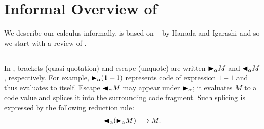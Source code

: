 
\section{Informal Overview of \LMD \label{sec:informal-overview}}

We describe our calculus \LMD informally.  \LMD is based on
\LTP~\cite{Hanada2014} by Hanada and Igarashi and so we start with a review of 
\LTP.

\subsection{\LTP}


In \LTP, brackets (quasi-quotation) and escape (unquote) are written
${\mathop{\blacktriangleright}}_\alpha M$ and ${\mathop{\blacktriangleleft}}_\alpha M$, respectively.  For example,
${\mathop{\blacktriangleright}}_\alpha (1 + 1)$ represents code of expression $1 + 1$ and thus
evaluates to itself.  Escape ${\mathop{\blacktriangleleft}}_\alpha M$ may appear under
${\mathop{\blacktriangleright}}_\alpha$; it evaluates $M$ to a code value and splices it into the
surrounding code fragment.  Such splicing is expressed by the
following reduction rule:
\begin{align*}
	{\mathop{\blacktriangleleft}}_\alpha ({\mathop{\blacktriangleright}}_\alpha M) \longrightarrow M .
\end{align*}

